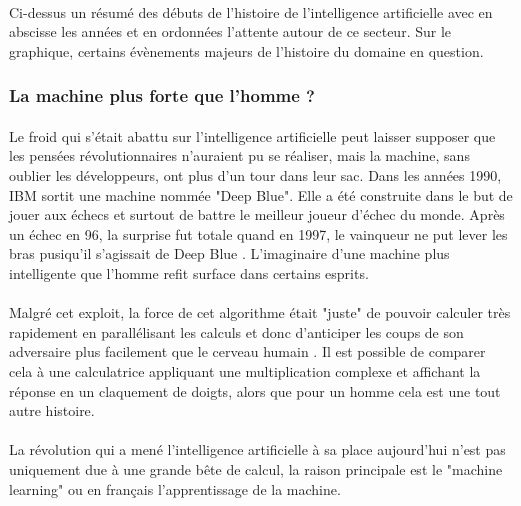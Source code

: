 \documentclass[10pt, french, a4paper]{article}
\begin{document}
\paragraph{}
Ci-dessus un résumé des débuts de l’histoire de l’intelligence artificielle avec en abscisse les années et en ordonnées l’attente autour de ce secteur. Sur le graphique, certains évènements majeurs de l’histoire du domaine en question.

\subsubsection{La machine plus forte que l'homme ?}

\paragraph{}
Le froid qui s’était abattu sur l’intelligence artificielle peut laisser supposer que les pensées révolutionnaires n’auraient pu se réaliser, mais la machine, sans oublier les développeurs, ont plus d’un tour dans leur sac. Dans les années 1990, IBM sortit une machine nommée "Deep Blue". Elle a été construite dans le but de jouer aux échecs et surtout de battre le meilleur joueur d’échec du monde. Après un échec en 96, la surprise fut totale quand en 1997, le vainqueur ne put lever les bras pusiqu’il s’agissait de Deep Blue \citep{krauthammer_be_1997}. L’imaginaire d’une machine plus intelligente que l’homme refit surface dans certains esprits.

\paragraph{}
Malgré cet exploit, la force de cet algorithme était "juste" de pouvoir calculer très rapidement en parallélisant les calculs et donc d’anticiper les coups de son adversaire plus facilement que le cerveau humain \citep{hsu_deep_1995}. Il est possible de comparer cela à une calculatrice appliquant une multiplication complexe et affichant la réponse en un claquement de doigts, alors que pour un homme cela est une tout autre histoire.

\paragraph{}
La révolution qui a mené l’intelligence artificielle à sa place aujourd’hui n’est pas uniquement due à une grande bête de calcul, la raison principale est le "machine learning" ou en français l’apprentissage de la machine.
\end{document}
